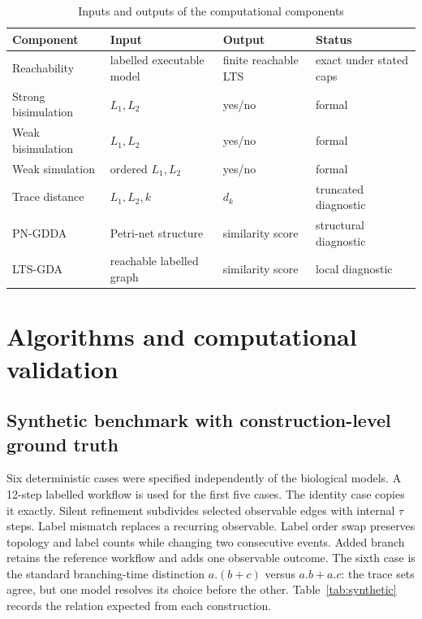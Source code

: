 \documentclass[JMCS,submit]{resources/ISRP}
\theoremstyle{definition}
\theoremstyle{remark}
\numberwithin{equation}{section}
\newcommand{\TAU}{\tau}
\begin{document}
\begin{table}[t]
\caption{Inputs and outputs of the computational components}
\label{tab:components}
\centering
\small
\begin{tabularx}{\textwidth}{@{}p{}YYp{0.17\textwidth}@{}}
\toprule
Component & Input & Output & Status \\
\midrule
Reachability & labelled executable model & finite reachable LTS & exact under stated caps \\
Strong bisimulation & $L_1,L_2$ & yes/no & formal \\
Weak bisimulation & $L_1,L_2$ & yes/no & formal \\
Weak simulation & ordered $L_1,L_2$ & yes/no & formal \\
Trace distance & $L_1,L_2,k$ & $d_k$ & truncated diagnostic \\
PN-GDDA & Petri-net structure & similarity score & structural diagnostic \\
LTS-GDA & reachable labelled graph & similarity score & local diagnostic \\
\bottomrule
\end{tabularx}
\end{table}

\section{Algorithms and computational validation}
\label{sec:computational-validation}

\subsection{Synthetic benchmark with construction-level ground truth}
\label{sec:benchmark-method}

Six deterministic cases were specified independently of the biological models.
A 12-step labelled workflow is used for the first five cases. The identity case
copies it exactly. Silent refinement subdivides selected observable edges with
internal $\TAU$ steps. Label mismatch replaces a recurring observable. Label
order swap preserves topology and label counts while changing two consecutive
events. Added branch retains the reference workflow and adds one observable
outcome. The sixth case is the standard branching-time distinction
$a.(b+c)$ versus $a.b+a.c$: the trace sets agree, but one model resolves its
choice before the other. Table~\ref{tab:synthetic} records the relation expected
from each construction.
\end{document}
